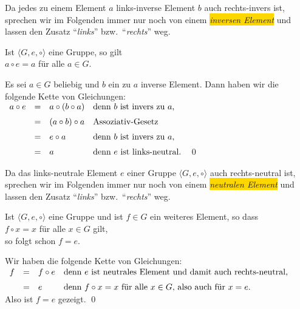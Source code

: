 \remark
Da jedes zu einem Element $a$ links-inverse Element $b$ auch rechts-invers ist, sprechen wir im Folgenden
immer nur noch von einem \colorbox{gold}{\emph{inversen Element}} und lassen den Zusatz
``\emph{links}'' bzw.~``\emph{rechts}'' weg.  
\eox

\begin{Satz} \lb
  Ist $\langle G, e, \circ \rangle$ eine Gruppe, so gilt
  \\[0.2cm]
  \hspace*{1.3cm}
  $a \circ e = a$ \quad f\"{u}r alle $a \in G$.
\end{Satz}

\proof
Es sei $a \in G$ beliebig und $b$ ein zu $a$ inverse Element.  Dann haben wir die folgende Kette von
Gleichungen:
\\[0.2cm]
\hspace*{1.3cm}
$
\begin{array}[b]{lcll}
  a \circ e & = & a \circ (b \circ a) 
                & \mbox{denn $b$ ist invers zu $a$,} \\[0.2cm]
            & = & (a \circ b) \circ a
                & \mbox{Assoziativ-Gesetz} \\[0.2cm]
            & = & e \circ a
                & \mbox{denn $b$ ist invers zu $a$,} \\[0.2cm]
            & = & a 
                & \mbox{denn $e$ ist links-neutral.}
\end{array}
$
\qed
\pagebreak

\remark
Da das links-neutrale Element $e$ einer Gruppe $\langle G, e, \circ \rangle$ auch rechts-neutral ist,
sprechen wir im Folgenden
immer nur noch von einem \colorbox{gold}{\emph{neutralen Element}} und lassen den Zusatz
``\emph{links}'' bzw.~``\emph{rechts}'' weg. 
\eox

\begin{Satz} \lb
  Ist $\langle G, e, \circ \rangle$ eine Gruppe und ist $f \in G$ ein weiteres  Element, so dass
  \\[0.2cm]
  \hspace*{1.3cm}
  $f \circ x = x$ \quad f\"{u}r alle $x \in G$ gilt,
  \\[0.2cm]
  so folgt schon $f = e$.
\end{Satz}

\proof
Wir haben die folgende Kette von Gleichungen:
\\[0.2cm]
\hspace*{1.3cm}
$
\begin{array}[t]{lcll}
  f & = & f \circ e & \mbox{denn $e$ ist neutrales Element und damit auch rechts-neutral,} \\[0.2cm]
    & = & e         & \mbox{denn $f \circ x = x$ f\"{u}r alle $x \in G$, also auch f\"{u}r $x = e$.} 
\end{array}
$
\\[0.2cm]
Also ist $f = e$ gezeigt. \qed

